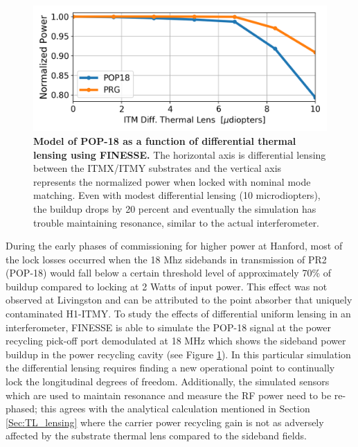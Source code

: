 	\begin{figure}[t!]
	\centering
	\includegraphics[width=0.75 \textwidth]{../Figures/POP_18dive.png}
	\caption[Model of POP-18 as a function of differential thermal lensing using FINESSE.]  
	{\textbf{Model of POP-18 as a function of differential thermal lensing using FINESSE.}
		The horizontal axis is differential lensing between the ITMX/ITMY substrates and the vertical axis represents the normalized power when locked with nominal mode matching.  Even with modest differential lensing (10 microdiopters), the buildup drops by 20 percent and eventually the simulation has trouble maintaining resonance, similar to the actual interferometer.
	}
	\label{fig:POP18}
	\end{figure}

	During the early phases of commissioning for higher power at Hanford, most of the lock losses occurred when the 18 Mhz sidebands in transmission of PR2 (POP-18) would fall below a certain threshold level of approximately 70\% of buildup compared to locking at 2 Watts of input power.  This effect was not observed at Livingston and can be attributed to the point absorber that uniquely contaminated H1-ITMY.  To study the effects of differential uniform lensing in an interferometer, FINESSE is able to simulate the POP-18 signal at the power recycling pick-off port demodulated at 18 MHz which shows the sideband power buildup in the power recycling cavity (see Figure \ref{fig:POP18}). In this particular simulation the differential lensing requires finding a new operational point to continually lock the longitudinal degrees of freedom.  Additionally, the simulated sensors which are used to maintain resonance and measure the RF power need to be re-phased; this agrees with the analytical calculation mentioned in Section \ref{Sec:TL_lensing} where the carrier power recycling gain is not as adversely affected by the substrate thermal lens compared to the sideband fields.
	
